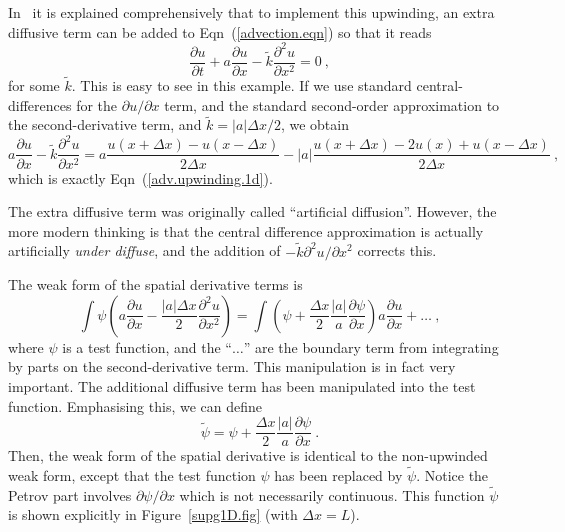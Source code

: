 \documentclass[]{scrreprt}
\begin{document}
In~\cite{brooks1982} it is explained comprehensively that to implement
this upwinding, an extra diffusive term can be added to
Eqn~(\ref{advection.eqn}) so that it reads
\begin{equation}
\frac{\partial u}{\partial t} + a\frac{\partial u}{\partial x} -
\tilde{k}\frac{\partial^{2} u}{\partial x^{2}} = 0 \ ,
\label{adv.upwinded.eqn}
\end{equation}
for some $\tilde{k}$.
This is easy to see in this example.  If we use standard
central-differences for the $\partial u/\partial x$ term, and the
standard second-order approximation to the second-derivative term, and
$\tilde{k} = |a|\Delta x/2$, we obtain
\begin{equation}
a\frac{\partial u}{\partial x} - \tilde{k}\frac{\partial^{2} u}{\partial x^{2}} =
a \frac{u(x+\Delta x) - u(x-\Delta x)}{2\Delta x} -
|a|\frac{u(x+\Delta x) - 2 u(x) + u(x - \Delta x)}{2\Delta x} \ ,
\end{equation}
which is exactly Eqn~(\ref{adv.upwinding.1d}).

The extra diffusive term was originally called ``artificial
diffusion''.  However, the more
modern thinking is that the central difference approximation is
actually artificially {\em under diffuse}, and the addition of
$-\tilde{k}{\partial^{2} u}/{\partial x^{2}}$ corrects this.

The weak form of the spatial derivative terms is
\begin{equation}
\int \psi \left(a\frac{\partial u}{\partial x} -
\frac{|a|\Delta x}{2} \frac{\partial^{2} u}{\partial x^{2}}\right)
 = \int \left( \psi + \frac{\Delta x}{2}\frac{|a|}{a}\frac{\partial
   \psi}{\partial x} \right) a\frac{\partial u}{\partial x} + \ldots \ ,
\end{equation}
where $\psi$ is a test function, and the ``$\ldots$'' are the boundary
term from integrating by parts on the second-derivative term.  This
manipulation is in fact very important.  The additional diffusive term
has been manipulated into the test function.  Emphasising this, we can
define
\begin{equation}
\tilde{\psi} = \psi + \frac{\Delta x}{2}\frac{|a|}{a}\frac{\partial
   \psi}{\partial x} \ .
\label{eqn.simple.pg.1d}
\end{equation}
Then, the weak form of the spatial derivative is identical to the
non-upwinded weak form, except that the test function $\psi$ has been
replaced by $\tilde{\psi}$.  Notice the Petrov part involves
$\partial\psi/\partial x$ which is not necessarily continuous.  This
function $\tilde{\psi}$ is shown explicitly in Figure~\ref{supg1D.fig}
(with $\Delta x = L$).
\end{document}
